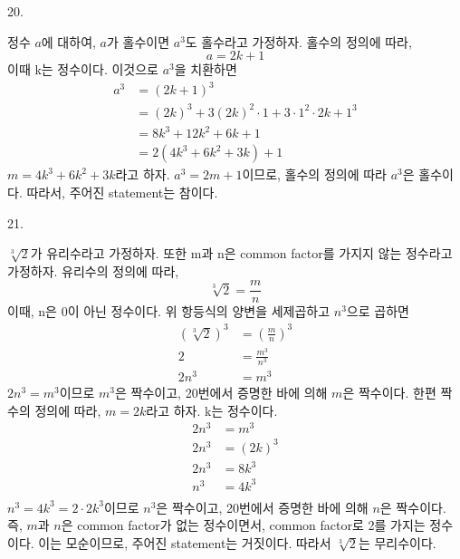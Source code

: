 \documentclass{article}
\begin{document}
20.
\begin{addmargin}[1em]{2em}
정수 $a$에 대하여, $a$가 홀수이면 $a^3$도 홀수라고 가정하자. 홀수의 정의에 따라,
\[a=2k+1\]
이때 k는 정수이다. 이것으로 $a^3$을 치환하면
\begin{align*}
    a^3 &= (2k+1)^3 \\
    &= (2k)^3 + 3(2k)^2\cdot 1 + 3\cdot 1^2\cdot 2k + 1^3 \\
    &= 8k^3 + 12k^2 + 6k + 1 \\
    &= 2(4k^3 + 6k^2 + 3k) + 1
\end{align*}
$m = 4k^3 + 6k^2 + 3k$라고 하자. $a^3 = 2m + 1$이므로, 홀수의 정의에 따라 $a^3$은 홀수이다.
따라서, 주어진 statement는 참이다.
\end{addmargin}
\bigskip

21.
\begin{addmargin}[1em]{2em}
$\sqrt[3]{2}$가 유리수라고 가정하자. 또한 m과 n은 common factor를 가지지 않는 정수라고 가정하자. 유리수의 정의에 따라,
\[\sqrt[3]{2} = \frac{m}{n}\]
이때, n은 0이 아닌 정수이다. 위 항등식의 양변을 세제곱하고 $n^3$으로 곱하면
\begin{align*}
    (\sqrt[3]{2})^3 &= \left (\frac{m}{n} \right)^3 \\
    2 &= \frac{m^3}{n^3} \\
    2n^3 &= m^3
\end{align*}
$2n^3=m^3$이므로 $m^3$은 짝수이고, 20번에서 증명한 바에 의해 $m$은 짝수이다. 한편 짝수의 정의에 따라, $m=2k$라고 하자. k는 정수이다.
\begin{align*}
    2n^3 &= m^3 \\
    2n^3 &= (2k)^3 \\
    2n^3 &= 8k^3 \\
    n^3 &= 4k^3 \\
\end{align*}
$n^3 = 4k^3 = 2\cdot 2k^3$이므로 $n^3$은 짝수이고, 20번에서 증명한 바에 의해 $n$은 짝수이다.
\newline
즉, $m$과 $n$은 common factor가 없는 정수이면서, common factor로 2를 가지는 정수이다. 이는 모순이므로, 주어진 statement는 거짓이다. 따라서 $\sqrt[3]{2}$는 무리수이다.
\end{addmargin}
\bigskip
\end{document}
